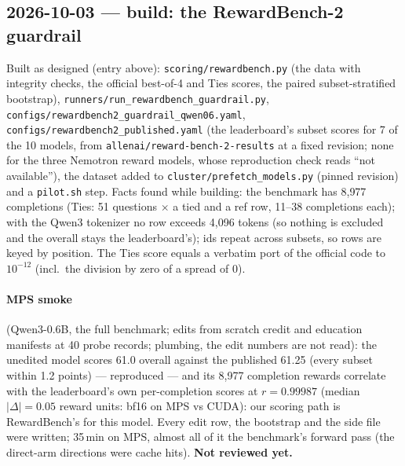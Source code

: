 \documentclass{article}
\begin{document}
\subsection*{2026-10-03 --- build: the RewardBench-2 guardrail}
Built as designed (entry above): \texttt{scoring/rewardbench.py} (the data with integrity checks, the official
best-of-4 and Ties scores, the paired subset-stratified bootstrap), \texttt{runners/run\_rewardbench\_guardrail.py},
\texttt{configs/rewardbench2\_guardrail\_qwen06.yaml}, \texttt{configs/rewardbench2\_published.yaml} (the leaderboard's
subset scores for 7 of the 10 models, from \texttt{allenai/reward-bench-2-results} at a fixed revision; none for the
three Nemotron reward models, whose reproduction check reads ``not available''), the dataset added to
\texttt{cluster/prefetch\_models.py} (pinned revision) and a \texttt{pilot.sh} step. Facts found while building: the
benchmark has 8{,}977 completions (Ties: 51 questions $\times$ a tied and a ref row, 11--38 completions each); with the
Qwen3 tokenizer no row exceeds 4{,}096 tokens (so nothing is excluded and the overall stays the leaderboard's); ids
repeat across subsets, so rows are keyed by position. The Ties score equals a verbatim port of the official code to
$10^{-12}$ (incl.\ the division by zero of a spread of 0).

\paragraph{MPS smoke} (Qwen3-0.6B, the full benchmark; edits from scratch credit and education manifests at 40 probe
records; plumbing, the edit numbers are not read): the unedited model scores 61.0 overall against the published
61.25 (every subset within 1.2 points) --- reproduced --- and its 8{,}977 completion rewards correlate with the
leaderboard's own per-completion scores at $r = 0.99987$ (median $|\Delta| = 0.05$ reward units: bf16 on MPS vs CUDA):
our scoring path is RewardBench's for this model. Every edit row, the bootstrap and the side file were written; 35\,min
on MPS, almost all of it the benchmark's forward pass (the direct-arm directions were cache hits). \textbf{Not reviewed
yet.}
\end{document}
